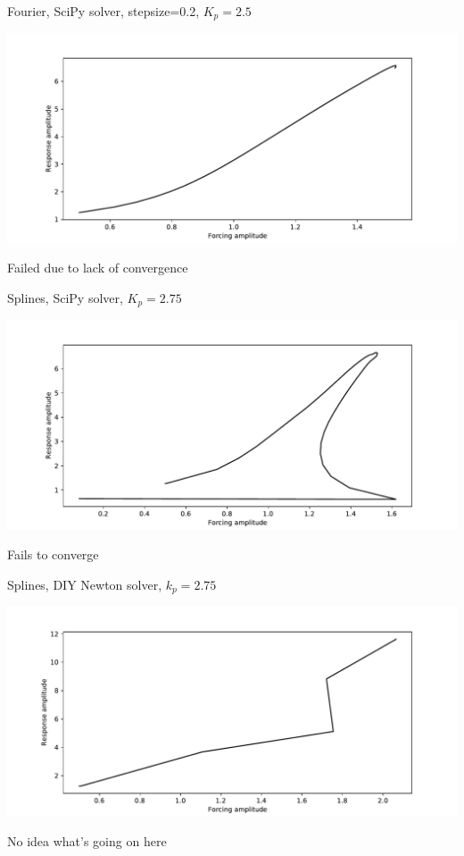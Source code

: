 \documentclass[presentation]{beamer}
\begin{document}
\begin{frame}[label={sec:org1e90107}]{Fourier, SciPy solver, stepsize=0.2, \(K_p=2.5\)}
\begin{center}
\includegraphics[width=.9\linewidth]{./kp2d5_transtime100_scipy_fourier_ss0d2.pdf}
\end{center}

Failed due to lack of convergence
\end{frame}

\begin{frame}[label={sec:orgb4d640e}]{Splines, SciPy solver, \(K_p=2.75\)}
\begin{center}
\includegraphics[width=.9\linewidth]{./kp2d75_transtime100_scipy.pdf}
\end{center}

Fails to converge
\end{frame}

\begin{frame}[label={sec:org3ad0d87}]{Splines, DIY Newton solver, \(k_p=2.75\)}
\begin{center}
\includegraphics[width=.9\linewidth]{./kp2d75_transtime100_newton.pdf}
\end{center}

No idea what's going on here
\end{frame}
\end{document}

